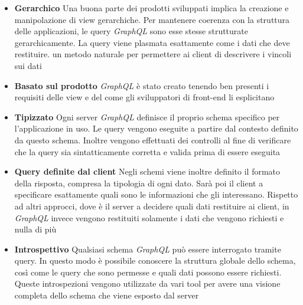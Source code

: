 \begin{itemize}
	\item \textbf{Gerarchico} Una buona parte dei prodotti sviluppati implica la creazione e manipolazione di view gerarchiche. Per mantenere coerenza con la struttura delle applicazioni, le query \emph{GraphQL} sono esse stesse strutturate gerarchicamente. La query viene plasmata esattamente come i dati che deve restituire. \upe un metodo naturale per permettere ai client di descrivere i vincoli sui dati
	\item \textbf{Basato sul prodotto} \emph{GraphQL} è stato creato tenendo ben presenti i requisiti delle view e del come gli sviluppatori di front-end li esplicitano
	\item \textbf{Tipizzato} Ogni server \emph{GraphQL} definisce il proprio schema specifico per l'applicazione in uso. Le query vengono eseguite a partire dal contesto definito da questo schema. Inoltre vengono effettuati dei controlli al fine di verificare che la query sia sintatticamente corretta e valida  prima di essere eseguita
	\item \textbf{Query definite dal client} Negli schemi viene inoltre definito il formato della risposta, compresa la tipologia di ogni dato. Sarà poi il client a specificare esattamente quali sono le informazioni che gli interessano. Rispetto ad altri approcci, dove è il server a decidere quali dati restituire ai client, in \emph{GraphQL} invece vengono restituiti solamente i dati che vengono richiesti e nulla di più
	\item \textbf{Introspettivo} Qualsiasi schema \emph{GraphQL} può essere interrogato tramite query. In questo modo è possibile conoscere la struttura globale dello schema, così come le query che sono permesse e quali dati possono essere richiesti. Queste introspezioni vengono utilizzate da vari tool per avere una visione completa dello schema che viene esposto dal server
\end{itemize}

\begin{center}
	\begin{minipage}[t]{0.5\textwidth}
		
	\end{minipage}%
	\hspace{5mm}%
	\begin{minipage}[t]{0.4\textwidth}
		
	\end{minipage}	
\end{center}

